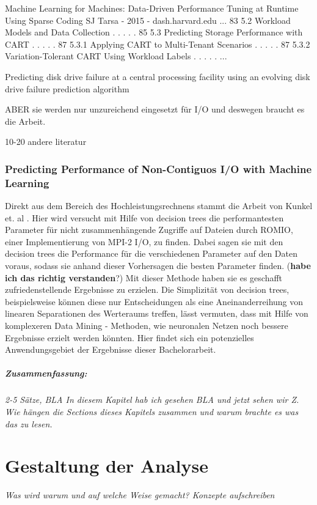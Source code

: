 \documentclass[
	12pt,
	a4paper,
	BCOR10mm,
	DIV14,
	listof=totoc,
	bibliography=totoc,
	headsepline
]{scrreprt}
\begin{document}
Machine Learning for Machines: Data-Driven Performance Tuning at Runtime Using Sparse Coding
SJ Tarsa - 2015 - dash.harvard.edu
... 83 5.2 Workload Models and Data Collection . . . . . 85 5.3 Predicting Storage
Performance with CART . . . . . 87 5.3.1 Applying CART to Multi-Tenant Scenarios . . . . .
87 5.3.2 Variation-Tolerant CART Using Workload Labels . . . . . ... 

Predicting disk drive failure at a central processing facility using an evolving disk drive failure prediction algorithm

ABER sie werden nur unzureichend eingesetzt für I/O und deswegen braucht es die Arbeit.

10-20 andere literatur

\subsection{Predicting Performance of Non-Contiguos I/O with Machine Learning}
Direkt aus dem Bereich des Hochleistungsrechnens stammt die Arbeit von Kunkel et. al \cite{UMLTPTPONI15}. Hier wird versucht mit Hilfe von decision trees die performantesten Parameter für nicht zusammenhängende Zugriffe auf Dateien durch ROMIO, einer Implementierung von MPI-2 I/O, zu finden. Dabei sagen sie mit den decision trees die Performance für die verschiedenen Parameter auf den Daten voraus, sodass sie anhand dieser Vorhersagen die besten Parameter finden. (\textbf{habe ich das richtig verstanden}?) Mit dieser Methode haben sie es geschafft zufriedenstellende Ergebnisse zu erzielen. Die Simplizität von decision trees, beispielsweise können diese nur Entscheidungen als eine Aneinanderreihung von linearen Separationen des Werteraums treffen, lässt vermuten, dass mit Hilfe von komplexeren Data Mining - Methoden, wie neuronalen Netzen noch bessere Ergebnisse erzielt werden könnten. Hier findet sich ein potenzielles Anwendungsgebiet der Ergebnisse dieser Bachelorarbeit.

\paragraph{Zusammenfassung:}
\textit{2-5 Sätze, BLA In diesem Kapitel hab ich gesehen BLA und jetzt sehen wir Z. Wie hängen die Sections dieses Kapitels zusammen und warum brachte es was das zu lesen.}


\chapter{Gestaltung der Analyse}
\textit{%
	Was wird warum und auf welche Weise gemacht? Konzepte aufschreiben
}
\bigskip
\end{document}
